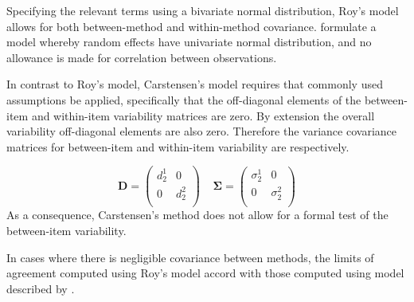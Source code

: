 \documentclass[12pt, a4paper]{report}
\theoremstyle{plain}
\theoremstyle{definition}
\theoremstyle{remark}
\begin{document}
	Specifying the relevant terms using a bivariate normal distribution, Roy's model allows for both between-method and within-method covariance. \citet{BXC2008} formulate a model whereby random effects have univariate normal distribution, and no allowance is made for correlation between observations.
	
	In contrast to Roy's model, Carstensen's model requires that commonly used assumptions be applied, specifically that the off-diagonal elements of the between-item and within-item variability matrices are zero. By
	extension the overall variability off-diagonal elements are also zero. Therefore the variance covariance matrices for
	between-item and within-item variability are respectively.
	
	\[\boldsymbol{D} = \left(
	\begin{array}{cc}
	d^1_2  & 0 \\
	0 & d^2_2 \\
	\end{array}
	\right) \;\;\;\; \boldsymbol{\Sigma} = \left(
	\begin{array}{cc}
	\sigma^1_2  & 0 \\
	0 & \sigma^2_2 \\
	\end{array}
	\right) \]
	As a consequence, Carstensen's method does not allow for a formal test of the between-item variability.
	
	
	
	
	
	
	
	
	
	
	In cases where there is negligible covariance between methods, the limits of agreement computed using Roy's model accord with those computed using model described by \citet{BXC2008}. 
	
\end{document}
